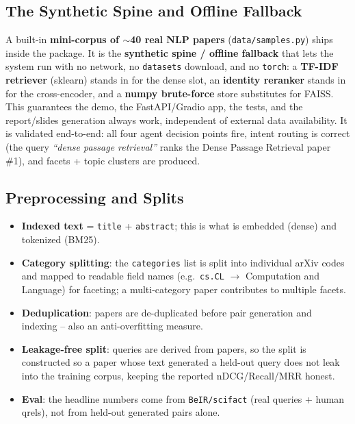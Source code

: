 \documentclass[12pt,a4paper]{article}
\begin{document}
\subsection{The Synthetic Spine and Offline Fallback}

A built-in \textbf{mini-corpus of $\sim$40 real NLP papers} (\texttt{data/samples.py}) ships inside the package. It is the \textbf{synthetic spine / offline fallback} that lets the system run with no network, no \texttt{datasets} download, and no \texttt{torch}: a \textbf{TF-IDF retriever} (sklearn) stands in for the dense slot, an \textbf{identity reranker} stands in for the cross-encoder, and a \textbf{numpy brute-force} store substitutes for FAISS. This guarantees the demo, the FastAPI/Gradio app, the tests, and the report/slides generation always work, independent of external data availability. It is validated end-to-end: all four agent decision points fire, intent routing is correct (the query \emph{``dense passage retrieval''} ranks the Dense Passage Retrieval paper \#1), and facets + topic clusters are produced.

\subsection{Preprocessing and Splits}

\begin{itemize}\setlength\itemsep{0.15em}
  \item \textbf{Indexed text} = \texttt{title} + \texttt{abstract}; this is what is embedded (dense) and tokenized (BM25).
  \item \textbf{Category splitting}: the \texttt{categories} list is split into individual arXiv codes and mapped to readable field names (e.g.\ \texttt{cs.CL} $\rightarrow$ Computation and Language) for faceting; a multi-category paper contributes to multiple facets.
  \item \textbf{Deduplication}: papers are de-duplicated before pair generation and indexing -- also an anti-overfitting measure.
  \item \textbf{Leakage-free split}: queries are derived from papers, so the split is constructed so a paper whose text generated a held-out query does not leak into the training corpus, keeping the reported nDCG/Recall/MRR honest.
  \item \textbf{Eval}: the headline numbers come from \texttt{BeIR/scifact} (real queries + human qrels), not from held-out generated pairs alone.
\end{itemize}
\end{document}
